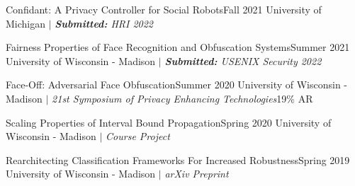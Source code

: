 
    \CVSubheading
      {Confidant: A Privacy Controller for Social Robots}{Fall 2021}
      {{University of Michigan} $|$ \emph{\small{\textbf{Submitted:} HRI 2022}}}{}
      
    \CVSubheading
      {{Fairness Properties of Face Recognition and Obfuscation Systems}\cite{Fairness}}{Summer 2021}
      {{University of Wisconsin - Madison} $|$ \emph{\small{\textbf{Submitted:} USENIX Security 2022}}}{}


    \CVSubheading
      {{Face-Off: Adversarial Face Obfuscation}\cite{FaceOff}}{Summer 2020}
      {{University of Wisconsin - Madison} $|$ \emph{\small{21st Symposium of Privacy Enhancing Technologies}}}{19\% AR}

    \CVSubheading
      {Scaling Properties of Interval Bound Propagation}{Spring 2020}
      {{University of Wisconsin - Madison} $|$ \emph{\small{Course Project}}}{}

    \CVSubheading
      {{Rearchitecting Classification Frameworks For Increased Robustness}\cite{Robustness}}{Spring 2019}
      {{University of Wisconsin - Madison} $|$ \emph{\small{arXiv Preprint}}}{}

  \CVSubHeadingListEnd